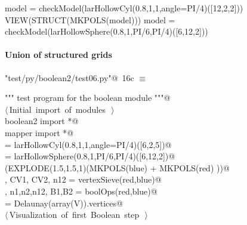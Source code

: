 \documentclass[11pt,oneside]{article}	%
\begin{document}
model = checkModel(larHollowCyl(0.8,1,1,angle=PI/4)([12,2,2]))
VIEW(STRUCT(MKPOLS(model)))
model = checkModel(larHollowSphere(0.8,1,PI/6,PI/4)([6,12,2]))


\paragraph{Union of structured grids}

\begin{flushleft} \small
\begin{minipage}{\linewidth} \label{scrap36}
\protect{}\verb@"test/py/boolean2/test06.py"@\nobreak\ {\footnotesize 16c }$\equiv$
\vspace{-1ex}
\begin{list}{}{} \item
\mbox{}\verb@""" test program for the boolean module """@\\
\mbox{}\verb@@\hbox{$\langle\,$Initial import of modules\nobreak\ {\footnotesize {}}$\,\rangle$}\verb@@\\
\mbox{}\verb@from boolean2 import *@\\
\mbox{}\verb@from mapper import *@\\
\mbox{}\verb@blue = larHollowCyl(0.8,1,1,angle=PI/4)([6,2,5])@\\
\mbox{}\verb@red = larHollowSphere(0.8,1,PI/6,PI/4)([6,12,2])@\\
\mbox{}\verb@VIEW(EXPLODE(1.5,1.5,1)(MKPOLS(blue) + MKPOLS(red) ))@\\
\mbox{}\verb@V, CV1, CV2, n12 = vertexSieve(red,blue)@\\
\mbox{}\verb@V, n1,n2,n12, B1,B2 = boolOps(red,blue)@\\
\mbox{}\verb@CV = Delaunay(array(V)).vertices@\\
\mbox{}\verb@@\hbox{$\langle\,$Visualization of first Boolean step\nobreak\ {\footnotesize {}}$\,\rangle$}\verb@@\\
\mbox{}\verb@@{\NWsep}
\end{list}
\vspace{-2ex}
\end{minipage}\\[4ex]
\end{flushleft}
\end{document}
